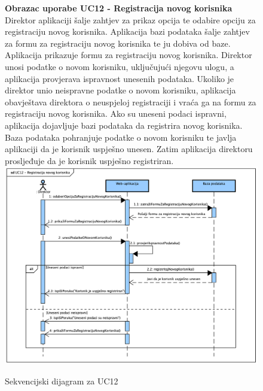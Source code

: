 				\begin{figure}[H]
					\textbf{Obrazac uporabe UC12 - Registracija novog korisnika}
					Direktor aplikaciji šalje zahtjev za prikaz opcija te odabire opciju za registraciju novog korisnika. Aplikacija bazi podataka šalje zahtjev za formu za registraciju novog korisnika te ju dobiva od baze. Aplikacija prikazuje
					formu za registraciju novog korisnika. Direktor unosi podatke o novom korisniku, uključujući njegovu ulogu, a aplikacija provjerava ispravnost unesenih podataka. Ukoliko je direktor unio neispravne podatke o novom korisniku,
					aplikacija obavještava direktora o neuspjeloj registraciji i vraća ga na formu za registraciju novog korisnika. Ako su uneseni podaci ispravni, aplikacija dojavljuje bazi podataka da registrira novog korisnika. Baza podataka
					pohranjuje podatke o novom korisniku te javlja aplikaciji da je korisnik uspješno unesen. Zatim aplikacija direktoru prosljeđuje da je korisnik uspješno registriran.
					\newline
					\includegraphics[width=\textwidth]{slike/Sequence_UC12.png}
					\caption{Sekvencijski dijagram za UC12}
					\label{fig:sequence_UC12}
				\end{figure}

